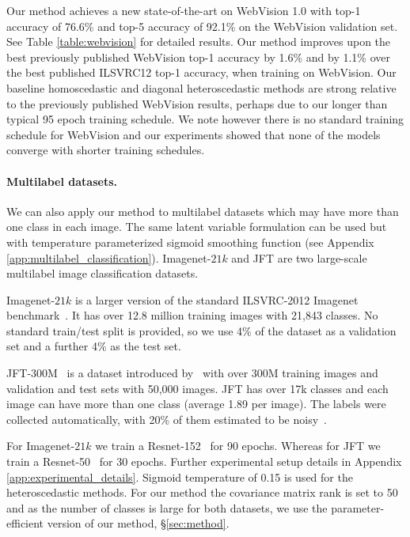 \documentclass[final]{cvpr}
\begin{document}
Our method achieves a new state-of-the-art on WebVision 1.0 with top-1 accuracy of 76.6\% and top-5 accuracy of 92.1\% on the WebVision validation set. See Table \ref{table:webvision} for detailed results. Our method improves upon the best previously published WebVision top-1 accuracy by 1.6\% and by 1.1\% over the best published ILSVRC12 top-1 accuracy, when training on WebVision. Our baseline homoscedastic and diagonal heteroscedastic methods are strong relative to the previously published WebVision results, perhaps due to our longer than typical 95 epoch training schedule. We note however there is no standard training schedule for WebVision and our experiments showed that none of the models converge with shorter training schedules.

\paragraph{Multilabel datasets.} We can also apply our method to multilabel datasets which may have more than one class in each image. The same latent variable formulation can be used but with temperature parameterized sigmoid smoothing function (see Appendix \ref{app:multilabel_classification}). Imagenet-$21k$ and JFT are two large-scale multilabel image classification datasets.

Imagenet-$21k$ is a larger version of the standard ILSVRC-2012 Imagenet benchmark~\cite{deng2009imagenet,kolesnikov2019big,beyer2020we,collier2020analysis}. It has over 12.8 million training images with 21,843 classes. No standard train/test split is provided, so we use 4\% of the dataset as a validation set and a further 4\% as the test set.

JFT-300M~\cite{distillation2015,chollet2017xception,sun2017revisiting,kolesnikov2019big} is a dataset introduced by~\citet{distillation2015} with over 300M training images and validation and test sets with 50,000 images. JFT has over 17k classes and each image can have more than one class (average 1.89 per image). The labels were collected automatically, with 20\% of them estimated to be noisy~\cite{sun2017revisiting}.


For Imagenet-$21k$ we train a Resnet-152~\cite{he2016deep} for 90 epochs. Whereas for JFT we train a Resnet-50~\cite{he2016deep} for 30 epochs. Further experimental setup details in Appendix \ref{app:experimental_details}. Sigmoid temperature of 0.15 is used for the heteroscedastic methods. For our method the covariance matrix rank is set to 50 and as the number of classes is large for both datasets, we use the parameter-efficient version of our method, \S \ref{sec:method}.
\end{document}
